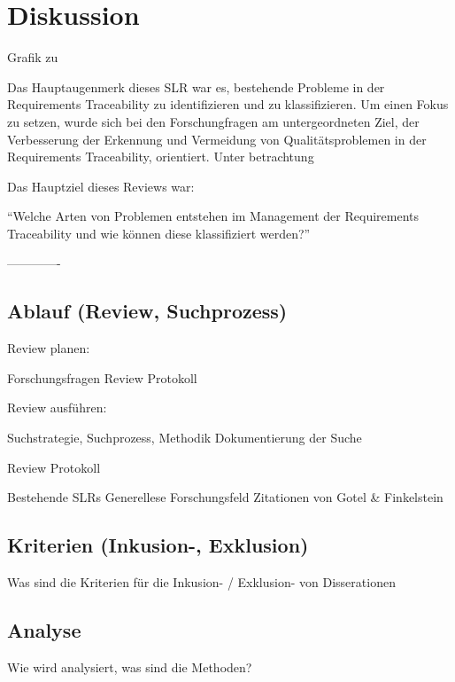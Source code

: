 \section{Diskussion}

Grafik zu

Das Hauptaugenmerk dieses SLR war es, bestehende Probleme in der Requirements Traceability zu identifizieren und zu klassifizieren. Um einen Fokus zu setzen, wurde sich bei den Forschungfragen am untergeordneten Ziel, der Verbesserung der Erkennung und Vermeidung von Qualitätsproblemen in der Requirements Traceability, orientiert. Unter betrachtung 

Das Hauptziel dieses Reviews war:

\begin{center}
\enquote{Welche Arten von Problemen entstehen im Management der Requirements Traceability und wie können diese klassifiziert werden?}
\end{center}

-------------



\subsection{Ablauf (Review, Suchprozess)}

Review planen:

Forschungsfragen
Review Protokoll

Review ausführen:

Suchstrategie, Suchprozess, Methodik
Dokumentierung der Suche

Review Protokoll

Bestehende SLRs
Generellese Forschungsfeld
Zitationen von Gotel \& Finkelstein

\subsection{Kriterien (Inkusion-, Exklusion)}

Was sind die Kriterien für die Inkusion- / Exklusion- von Disserationen

\subsection{Analyse}

Wie wird analysiert, was sind die Methoden?
